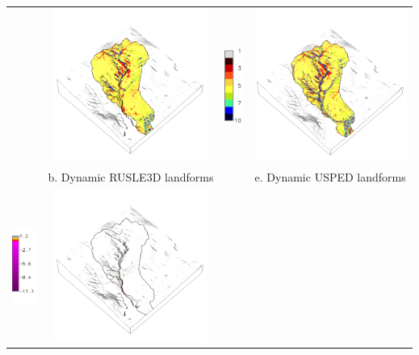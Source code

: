 \documentclass{standalone}
\begin{document}
\begin{tabular}{m{} m{} m{} m{}}
& \multicolumn{1}{c}{\includegraphics[height=50mm]{../../images/rusle_3d/landforms.png}}
& \multicolumn{1}{c}{\includegraphics[height=25mm]{../../images/usped_3d/legend_landforms.png}}
& \multicolumn{1}{c}{\includegraphics[height=50mm]{../../images/usped_3d/landforms.png}}\\
\multicolumn{1}{c}{} 
& \multicolumn{1}{c}{b. Dynamic RUSLE3D landforms}
& \multicolumn{1}{c}{} 
& \multicolumn{1}{c}{e. Dynamic USPED landforms}\\
%
\multicolumn{1}{c}{\includegraphics[height=25mm]{../../images/rusle_3d/legend_difference.png}}
& \multicolumn{1}{c}{\includegraphics[height=50mm]{../../images/rusle_3d/difference.png}}

\end{tabular}
\end{document}
